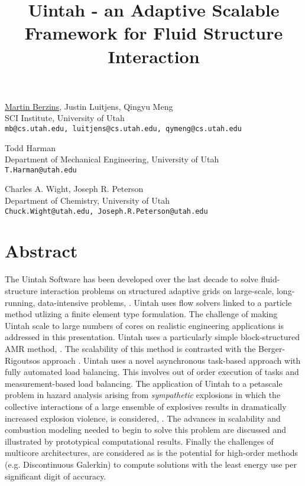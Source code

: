 \title{Uintah - an Adaptive Scalable Framework for Fluid Structure Interaction}
\author{} \institute{}
\maketitle

\begin{center}
{\underline{Martin Berzins}, Justin Luitjens, Qingyu Meng}\\
SCI Institute, University of Utah\\
{\tt mb@cs.utah.edu, luitjens@cs.utah.edu,  qymeng@cs.utah.edu}\\
\vspace{4mm}

{\large Todd Harman}\\
Department of Mechanical Engineering, University of Utah\\
{\tt T.Harman@utah.edu}\\
\vspace{4mm}

{\large Charles A. Wight, Joseph R. Peterson}\\
Department of Chemistry, University of Utah\\
{\tt Chuck.Wight@utah.edu, Joseph.R.Peterson@utah.edu}
\end{center}

\section*{Abstract}
The Uintah Software has been developed over the last decade \cite{csafe2,csafe3} to solve fluid-structure interaction problems on structured adaptive grids on large-scale, long-running, data-intensive problems, \cite{fourthmit}. Uintah uses flow solvers linked to a particle method utlizing a finite element type formulation. The challenge of making Uintah scale to large numbers of cores on realistic engineering applications is addressed in this presentation. Uintah uses a particularly simple block-structured AMR method, \cite{IPDPS10}. The scalability of this method is contrasted with the Berger-Rigoutsos approach \cite{BergerRigoutsos}. Uintah uses a novel asynchronous task-based approach with fully automated load balancing. This involves out of order execution of tasks \cite{Meng}  and measurement-based load balancing. The application of Uintah to a petascale problem in hazard analysis arising from {\it sympathetic} explosions in which the collective interactions of a large ensemble of explosives results in dramatically increased explosion violence, is considered, \cite{Ber2010b}. The advances in scalability and combustion modeling needed to begin to solve this problem are discussed and illustrated by prototypical computational results. Finally the challenges of multicore architectures, are considered as is the potential for high-order methods (e.g. Discontinuous Galerkin) to compute solutions with the least energy use per significant digit of accuracy.

